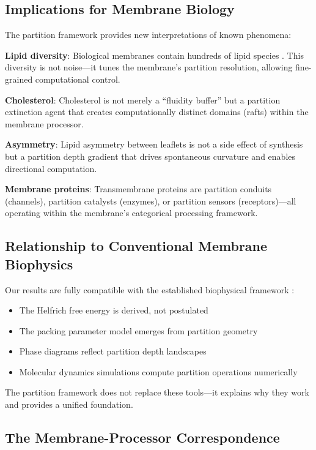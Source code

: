 \documentclass[twocolumn,10pt]{article}
\theoremstyle{remark}
\begin{document}
\subsection{Implications for Membrane Biology}

The partition framework provides new interpretations of known phenomena:

\textbf{Lipid diversity}: Biological membranes contain hundreds of lipid species \cite{vanmeer2008}. This diversity is not noise---it tunes the membrane's partition resolution, allowing fine-grained computational control.

\textbf{Cholesterol}: Cholesterol is not merely a ``fluidity buffer'' but a partition extinction agent that creates computationally distinct domains (rafts) within the membrane processor.

\textbf{Asymmetry}: Lipid asymmetry between leaflets \cite{bretscher1972} is not a side effect of synthesis but a partition depth gradient that drives spontaneous curvature and enables directional computation.

\textbf{Membrane proteins}: Transmembrane proteins are partition conduits (channels), partition catalysts (enzymes), or partition sensors (receptors)---all operating within the membrane's categorical processing framework.

\subsection{Relationship to Conventional Membrane Biophysics}

Our results are fully compatible with the established biophysical framework \cite{gennis1989,lipowsky1995}:
\begin{itemize}
    \item The Helfrich free energy is derived, not postulated
    \item The packing parameter model \cite{israelachvili1976} emerges from partition geometry
    \item Phase diagrams \cite{marsh2013} reflect partition depth landscapes
    \item Molecular dynamics simulations \cite{lindahl2008} compute partition operations numerically
\end{itemize}

The partition framework does not replace these tools---it explains why they work and provides a unified foundation.

\subsection{The Membrane-Processor Correspondence}
\end{document}
